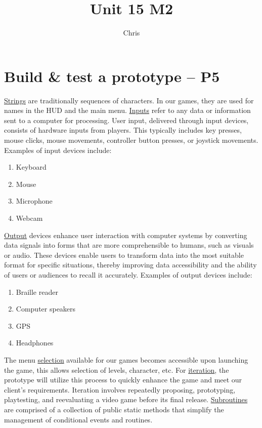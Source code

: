 \documentclass{article}
\begin{document}
\title{Unit 15 M2}
\author{Chris}
\date{}
\maketitle
 

\section{Build \& test a prototype – P5}

\underline{Strings} are traditionally sequences of characters. In our games, they are used for names in the HUD and the main menu. \underline{Inputs} refer to any data or information sent to a computer for processing. User input, delivered through input devices, consists of hardware inputs from players. This typically includes key presses, mouse clicks, mouse movements, controller button presses, or joystick movements. Examples of input devices include:
\begin{enumerate}
	\item Keyboard
	\item Mouse
	\item Microphone
	\item Webcam
\end{enumerate}
\underline{Output} devices enhance user interaction with computer systems by converting data signals into forms that are more comprehensible to humans, such as visuals or audio. These devices enable users to transform data into the most suitable format for specific situations, thereby improving data accessibility and the ability of users or audiences to recall it accurately. Examples of output devices include:
\begin{enumerate}
	\item Braille reader
	\item Computer speakers
	\item GPS
	\item Headphones
\end{enumerate}
The menu \underline{selection} available for our games becomes accessible upon launching the game, this allows selection of levels, character, etc. For \underline{iteration}, the prototype will utilize this process to quickly enhance the game and meet our client's requirements. Iteration involves repeatedly proposing, prototyping, playtesting, and reevaluating a video game before its final release. \underline{Subroutines} are comprised of a collection of public static methods that simplify the management of conditional events and routines. \newline
\end{document}
